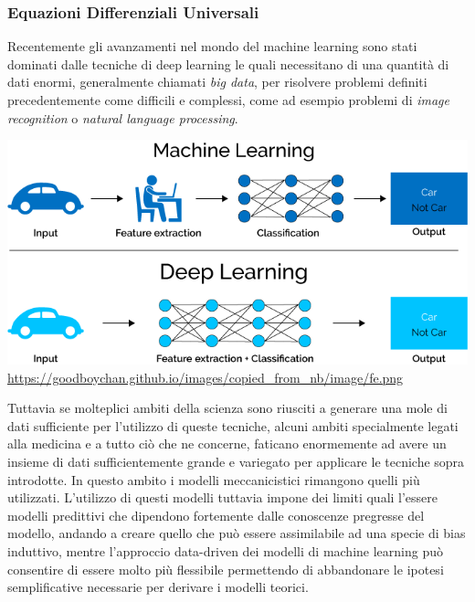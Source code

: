 \subsubsection*{Equazioni Differenziali Universali}
Recentemente gli avanzamenti nel mondo del machine learning sono stati dominati dalle tecniche 
di deep learning le quali necessitano di una quantità di dati enormi, generalmente chiamati \emph{big data}, 
per risolvere problemi definiti precedentemente come difficili e complessi, come ad esempio problemi di 
\emph{image recognition} o \emph{natural language processing}. 

\begin{minipage}{\linewidth}
    \centering
    \includegraphics[width=\textwidth]{img/Caratteristiche-e-funzionamento-del-Deep-Learning-in-informatica.png}
    \url{https://goodboychan.github.io/images/copied_from_nb/image/fe.png}
    \label{fig:ml_dl_example}
\end{minipage}

Tuttavia se molteplici ambiti della scienza sono riusciti a generare una mole di dati sufficiente per l'utilizzo di 
queste tecniche, alcuni ambiti specialmente legati alla medicina e a tutto ciò che ne concerne, faticano enormemente
ad avere un insieme di dati sufficientemente grande e variegato per applicare le tecniche sopra introdotte. In questo 
ambito i modelli meccanicistici rimangono quelli più utilizzati. L'utilizzo di questi modelli tuttavia impone dei limiti 
quali l'essere modelli predittivi che dipendono fortemente dalle conoscenze pregresse del modello, andando a creare quello 
che può essere assimilabile ad una specie di bias induttivo, mentre l'approccio data-driven dei modelli di machine learning 
può consentire di essere molto più flessibile permettendo di abbandonare le ipotesi semplificative 
necessarie per derivare i modelli teorici. 

